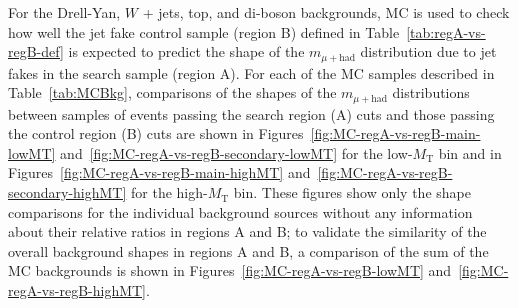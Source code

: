 For the Drell-Yan, $W$ + jets, top, and di-boson backgrounds, MC is used to check how well the jet fake control sample (region B) defined in Table~\ref{tab:regA-vs-regB-def} is expected to predict the shape of the $m_{\mu+\text{had}}$ distribution due to jet fakes in the search sample (region A).  For each of the MC samples described in Table~\ref{tab:MCBkg}, comparisons of the shapes of the $m_{\mu+\text{had}}$ distributions between samples of events passing the search region (A) cuts and those passing the control region (B) cuts are shown in Figures~\ref{fig:MC-regA-vs-regB-main-lowMT} and~\ref{fig:MC-regA-vs-regB-secondary-lowMT} for the low-$M_{\text{T}}$ bin and in Figures~\ref{fig:MC-regA-vs-regB-main-highMT} and~\ref{fig:MC-regA-vs-regB-secondary-highMT} for the high-$M_{\text{T}}$ bin. These figures show only the shape comparisons for the individual background sources without any information about their relative ratios in regions A and B; to validate the similarity of the overall background shapes in regions A and B, a comparison of the sum of the MC backgrounds is shown in Figures~\ref{fig:MC-regA-vs-regB-lowMT} and~\ref{fig:MC-regA-vs-regB-highMT}.

